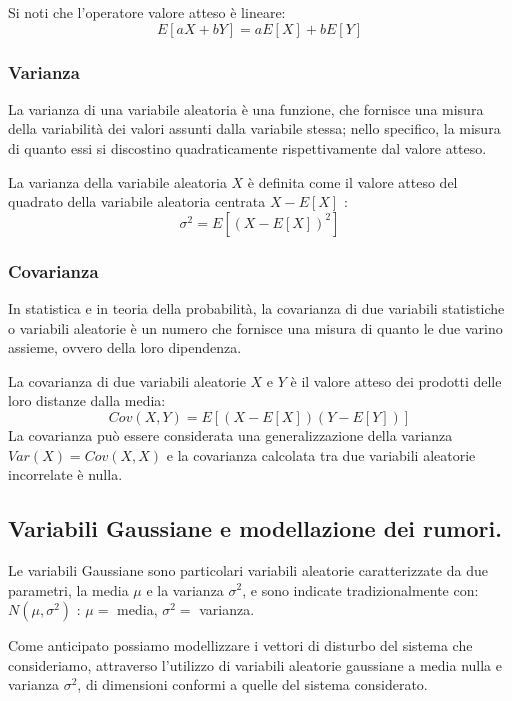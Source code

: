 \documentclass[12pt,a4paper]{article}
\begin{document}
\noindent  Si noti che l'operatore valore atteso è lineare: \[E[aX + bY] = aE[X] + bE[Y]\]




\subsubsection{Varianza}

La varianza di una variabile aleatoria è una funzione, che fornisce una misura della variabilità dei valori assunti dalla variabile stessa; nello specifico, la misura di quanto essi si discostino quadraticamente rispettivamente dal valore atteso.

La varianza della variabile aleatoria $X$ è definita come il valore atteso del quadrato della variabile aleatoria centrata $X - E[X]$ :\[\sigma^2 = E[(X - E[X])^2]\]

\subsubsection{Covarianza}

In statistica e in teoria della probabilità, la covarianza di due variabili statistiche o variabili aleatorie è un numero che fornisce una misura di quanto le due varino assieme, ovvero della loro dipendenza.

La covarianza di due variabili aleatorie $X$ e $Y$ è il valore atteso dei prodotti delle loro distanze dalla media: \[Cov(X,Y)= E [(X-E[X])(Y-E[Y])]\]
La covarianza può essere considerata una generalizzazione della varianza $Var(X) = Cov(X , X) $ e la covarianza calcolata tra due variabili aleatorie incorrelate è nulla.

\subsection{Variabili Gaussiane e modellazione dei rumori.}

Le variabili Gaussiane sono particolari variabili aleatorie caratterizzate da due parametri, la media $\mu$ e la varianza $\sigma^2$, e sono indicate tradizionalmente con: $N(\mu ,\sigma^2)$ : $\mu =$ media, $\sigma^2 =$ varianza.

Come anticipato possiamo modellizzare i vettori di disturbo del sistema che consideriamo, attraverso l’utilizzo di variabili aleatorie gaussiane a media nulla e varianza $\sigma^2$, di dimensioni conformi a quelle del sistema considerato.




 
\end{document}
